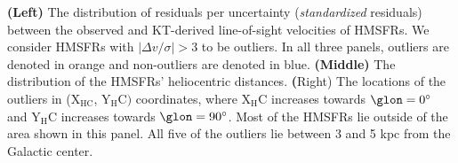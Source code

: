 \label{fig:outliers}
\textbf{(Left)} The distribution of residuals per uncertainty (\textit{standardized} residuals) between the observed and KT-derived line-of-sight velocities of HMSFRs. We consider HMSFRs with $\vert \Delta v / \sigma \vert > 3$ to be outliers. In all three panels, outliers are denoted in orange and non-outliers are denoted in blue. \textbf{(Middle)} The distribution of the HMSFRs' heliocentric distances. \textbf({Right}) The locations of the outliers in ($\mathrm{X_{HC}}$, $\mathrm{Y_HC})$ coordinates, where $\mathrm{X_HC}$ increases towards $\glon=0^\circ$ and $\mathrm{Y_HC}$ increases towards $\glon=90^\circ$. Most of the HMSFRs lie outside of the area shown in this panel. All five of the outliers lie between 3 and 5 kpc from the Galactic center.